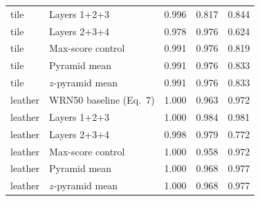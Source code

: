 \begin{tabular}{@{}llrrr@{}}
tile & Layers 1+2+3 & 0.996 & 0.817 & 0.844 \\
tile & Layers 2+3+4 & 0.978 & 0.976 & 0.624 \\
tile & Max-score control & 0.991 & 0.976 & 0.819 \\
tile & Pyramid mean & 0.991 & 0.976 & 0.833 \\
tile & $z$-pyramid mean & 0.991 & 0.976 & 0.833 \\
\midrule
leather & WRN50 baseline (Eq.~7) & 1.000 & 0.963 & 0.972 \\
leather & Layers 1+2+3 & 1.000 & 0.984 & 0.981 \\
leather & Layers 2+3+4 & 0.998 & 0.979 & 0.772 \\
leather & Max-score control & 1.000 & 0.958 & 0.972 \\
leather & Pyramid mean & 1.000 & 0.968 & 0.977 \\
leather & $z$-pyramid mean & 1.000 & 0.968 & 0.977 \\
\bottomrule
\end{tabular}
